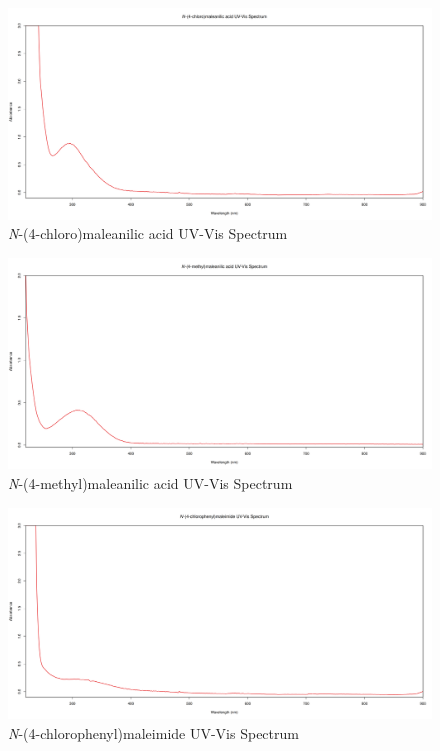 \documentclass[11pt]{article}
\begin{document}
\begin{figure}[H]
    \centering
    \includegraphics[scale=0.33]{spectra/uvvis9.1.png}
    \caption{\textit{N}-(4-chloro)maleanilic acid UV-Vis Spectrum}
\end{figure}
\begin{figure}[H]
    \centering
    \includegraphics[scale=0.33]{spectra/uvvis10.1.png}
    \caption{\textit{N}-(4-methyl)maleanilic acid UV-Vis Spectrum}
\end{figure}
\begin{figure}[H]
    \centering
    \includegraphics[scale=0.33]{spectra/uvvis9.2.png}
    \caption{\textit{N}-(4-chlorophenyl)maleimide UV-Vis Spectrum}
\end{figure}
\end{document}
